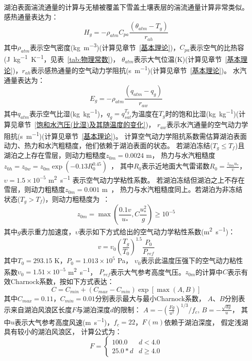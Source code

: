 湖泊表面湍流通量的计算与无植被覆盖下雪盖土壤表层的湍流通量计算非常类似。感热通量表达为：
\begin{equation}
H_{g}=-\rho_{atm} C_{p a} \frac{\left(\theta_{atm}-T_{g}\right)}{r_{a h}}
\end{equation}
其中$\rho_{atm}$表示空气密度(\unit{kg.m^{-3}})(计算见章节~\ref{基本理论})，$C_{pa}$表示空气的比热容(\unit{J.kg^{-1}.K^{-1}}，见表~\ref{tab:物理常数})，
$\theta_{atm}$表示大气位温(K)(计算见章节~\ref{基本理论})，$r_{ah}$表示感热通量的空气动力学阻抗(\unit{s.m^{-1}})(计算见章节~\ref{基本理论})。
水汽通量表达为：
\begin{equation}
E_{g}=-\rho_{atm} \frac{\left(q_{atm}-q_{g}\right)}{r_{a w}}
\end{equation}
其中$q_{atm}$表示空气比湿(\unit{kg.kg^{-1}})，$q_g=q_{sat}^{T_g}$为温度在$T_g$时的饱和比湿(\unit{kg.kg^{-1}})(计算见章节~\ref{饱和水汽压(比湿)及其随温度的变化})，
$r_{aw}$表示水汽通量的空气动力学阻抗(\unit{s.m^{-1}})(计算见章节~\ref{基本理论})。
计算空气动力学阻抗系数需估算湖泊表面动力、热力和水汽粗糙度，他们依赖于湖泊表面的状态。
若湖泊冻结($T_g\le T_f$)且湖泊之上存在雪层，则动力粗糙度$z_{0m}=0.0024$ m，
热力与水汽粗糙度$z_{0h}=z_{0w}=z_{0m}\exp{\left(-0.13R_0^{0.45}\right)}$~\citep{zilitinkevich1972dynamics}，
其中$R_0$表示近地面大气雷诺数$R_0=\frac{z_{0m}u_\ast}{\upsilon}$，
$\upsilon=1.5\times{10}^{-5}$ \unit{m^2.s^{-1}} 表示空气动力学粘性系数。
若湖泊冻结但湖泊之上不存在雪层，则动力粗糙度$z_{0m}=0.001$ m~\citep{subin2012improved}，
热力与水汽粗糙度同上。若湖泊为非冻结状态($T_g>T_f$)，则动力粗糙度为~\citep{subin2012improved}：
\begin{equation}
z_{0 m}=\max \left(\frac{0.1 v}{u_{*}}, C \frac{u_{*}^{2}}{g}\right) \geq 10^{-5}
\end{equation}
其中$g$表示重力加速度，$\upsilon$表示如下方式给出的空气动力学粘性系数(\unit{m^2.s^{-1}})：
\begin{equation}
v=v_{0}\left(\frac{T_{g}}{T_{0}}\right)^{1.5} \frac{P_{0}}{P_{r e f}}
\end{equation}
其中$T_0=293.15$ K，$P_0=1.013\times{10}^5$ Pa，
$\upsilon_0$表示此温度压强下的空气动力粘性系数$\upsilon_0=1.51\times{10}^{-5}$ \unit{m^2.s^{-1}}，
$P_{ref}$表示大气参考高度气压。$z_{0m}$的计算中$C$表示有效Charnock系数，按如下方式表达：
\begin{equation}
C=C_{min}+\left(C_{max}-C_{min}\right) \exp\left[\max (A, B)\right]
\end{equation}
其中$C_{max}=0.11$，$C_{min}=0.01$分别表示最大与最小Charnock系数，
$A$、$B$分别表示来自湖泊风浪区长度$F$与湖泊深度$d$的限制：
$A=-\left(\frac{Fg}{u^2}\right)^{1/3}/f_c$, $B=-\frac{\sqrt{dg}}{u}$，
其中$u$表示大气参考高度风速(\unit{m.s^{-1}})，$f_c=22$，$F(m)$依赖于湖泊深度，
假定浅湖具有较小的湖泊风浪区，
计算公式为：$$F=\left\{\begin{array}{ll}100.0 & d<4.0 \\ 25.0 * d & d \geq 4.0\end{array}\right.$$



